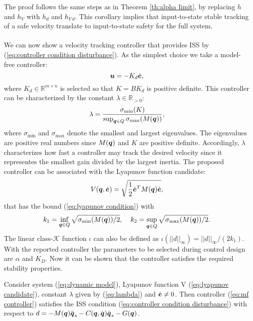 The proof follows the same steps as in Theorem \ref{th:alpha limit}, by replacing $h$ and $h_V$ with $h_d$ and $h_{V\,d}$. This corollary implies that input-to-state stable tracking of a safe velocity translate to input-to-state safety for the full system.\\
\\
We can now show a velocity tracking controller that provides ISS by (\ref{eq:controller condition disturbance}). As the simplest choice we take a model-free controller:
\begin{equation} \label{eq:mf controller}
    \boldsymbol{u} = -K_d \dot{\boldsymbol{e}},
\end{equation}
where $K_d \in \mathbb{R}^{m \times n}$ is selected so that $K=B K_d$ is positive definite. This controller can be characterized by the constant $\lambda \in \mathbb{R}_{>0}$:
\begin{equation} \label{eq:lambda}
    \lambda = \frac{\sigma_{\min}(K)}{\sup_{{\boldsymbol{q}} \in Q} \sigma_{\max}(M({\boldsymbol{q}}))},
\end{equation}
where $\sigma_{\min}$ and $\sigma_{\max}$ denote the smallest and largest eigenvalues. The eigenvalues are positive real numbers since $M({\boldsymbol{q}})$ and $K$ are positive definite. Accordingly, $\lambda$ characterizes how fast a controller may track the desired velocity since it representes the smallest gain divided by the largest inertia. The proposed controller can be associated with the Lyapunov function candidate:
\begin{equation} \label{eq:lyapunov candidate}
    V({\boldsymbol{q}},\dot{\boldsymbol{e}}) = \sqrt{\frac{1}{2} \dot{\boldsymbol{e}}^T M({\boldsymbol{q}}) \dot{\boldsymbol{e}}},
\end{equation}
that has the bound (\ref{eq:lyapunov condition}) with 
\begin{equation} 
    k_1= \inf_{{\boldsymbol{q}} \in Q} \sqrt{\sigma_{\min} (M({\boldsymbol{q}}))/2}, \;\;\;\; k_2= \sup_{{\boldsymbol{q}} \in Q} \sqrt{\sigma_{\max} (M({\boldsymbol{q}}))/2}.
\end{equation}
The linear class-$\mathcal{K}$ function $\iota$ can also be defined as $\iota(||d||_\infty)=||d||_\infty / (2 k_1)$. With the reported controller the parameters to be selected during control design are $\alpha$ and $K_D$. Now it can be shown that the controller satisfies the required stability properties.
\begin{theorem}
    Consider system (\ref{eq:dynamic model}), Lyapunov function V (\ref{eq:lyapunov candidate}), constant $\lambda$ given by (\ref{eq:lambda}) and $\dot{\boldsymbol{e}} \neq 0$. Then controller (\ref{eq:mf controller}) satisfies the ISS condition (\ref{eq:controller condition disturbance}) with respect to $d = -M({\boldsymbol{q}})\ddot{{\boldsymbol{q}}}_s-C({\boldsymbol{q}},\dot{{\boldsymbol{q}}})\dot{{\boldsymbol{q}}}_s-G({\boldsymbol{q}})$.
\end{theorem}
